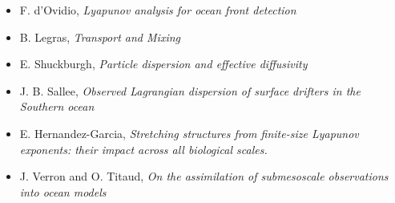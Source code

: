   \begin{itemize}
  \item F. d'Ovidio, {\em Lyapunov analysis for ocean
      front detection }
  \item B. Legras, {\em Transport and Mixing}
  \item E. Shuckburgh, {\em Particle dispersion and
      effective diffusivity }
  \item J. B. Sallee, {\em Observed Lagrangian
      dispersion of surface drifters in the Southern
      ocean }
  \item E. Hernandez-Garcia, {\em Stretching structures
      from finite-size Lyapunov exponents: their impact
      across all biological scales.}
 \item J. Verron and O. Titaud, {\em On the
     assimilation of submesoscale observations into
     ocean models }
  \end{itemize}

